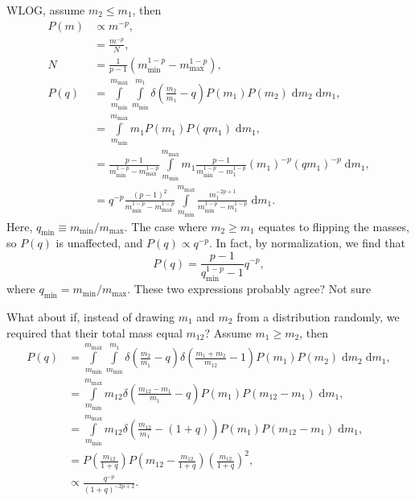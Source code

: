 \documentclass[11pt,
        usenames, %
        dvipsnames %
    ]{article}
\newcommand*{\p}[1]{\left(#1\right)}
\begin{document}
WLOG, assume $m_2 \leq m_1$, then
\begin{align}
    P(m) &\propto m^{-p},\\
         &= \frac{m^{-p}}{N},\\
    N &= \frac{1}{p - 1}\p{m_{\min}^{1 - p} - m_{\max}^{1 - p}},\\
    P(q) &= \int\limits_{m_{\min}}^{m_{\max}}\int\limits_{m_{\min}}^{m_1}
            \delta\p{\frac{m_2}{m_1} - q}P(m_1) P(m_2)
            \;\mathrm{d}m_2\;\mathrm{d}m_1,\\
        &= \int\limits_{m_{\min}}^{m_{\max}} m_1 P(m_1) P(qm_1)
            \;\mathrm{d}m_1,\\
        &= \frac{p - 1}{m_{\min}^{1 - p} - m_{\max}^{1 - p}}
            \int\limits_{m_{\min}}^{m_{\max}}
            m_1
            \frac{p - 1}{m_{\min}^{1 - p} - m_1^{1 - p}}
            \p{m_1}^{-p}\p{qm_1}^{-p}\;\mathrm{d}m_1,\\
        &= q^{-p}\frac{(p - 1)^2}{m_{\min}^{1 - p} - m_{\max}^{1 - p}}
            \int\limits_{m_{\min}}^{m_{\max}}
            \frac{m_1^{-2p + 1}}{m_{\min}^{1 - p} - m_1^{1 - p}}
            \;\mathrm{d}m_1.
\end{align}
Here, $q_{\min} \equiv m_{\min} / m_{\max}$. The case where $m_2 \geq m_1$
equates to flipping the masses, so $P(q)$ is unaffected, and $P(q) \propto
q^{-p}$. In fact, by normalization, we find that
\begin{equation}
    P(q) = \frac{p - 1}{q_{\min}^{1 - p} - 1}q^{-p},
\end{equation}
where $q_{\min} = m_{\min} / m_{\max}$. These two expressions probably agree?
Not sure

What about if, instead of drawing $m_1$ and $m_2$ from a distribution randomly,
we required that their total mass equal $m_{12}$? Assume $m_1 \geq m_2$, then
\begin{align}
    P(q) &= \int\limits_{m_{\min}}^{m_{\max}}
            \int\limits_{m_{\min}}^{m_1}
            \delta\p{\frac{m_2}{m_1} - q}
            \delta\p{\frac{m_1 + m_2}{m_{12}} - 1}
            P(m_1)
            P\p{m_2}\;\mathrm{d}m_2\;\mathrm{d}m_1,\\
        &= \int\limits_{m_{\min}}^{m_{\max}}
            m_{12}\delta\p{\frac{m_{12} - m_1}{m_1} - q}
            P(m_1)
            P\p{m_{12} - m_1}\;\mathrm{d}m_1,\\
        &=\int\limits_{m_{\min}}^{m_{\max}}
            m_{12}
            \delta\p{\frac{m_{12}}{m_1} - (1 + q)}
            P\p{m_1}
            P\p{m_{12} - m_1}\;\mathrm{d}m_1,\\
        &= P\p{\frac{m_{12}}{1 + q}}P\p{m_{12} - \frac{m_{12}}{1 + q}}
            \p{\frac{m_{12}}{1 + q}}^2,\\
        &\propto \frac{q^{-p}}{\p{1 + q}^{-2p + 2}}.
\end{align}
\end{document}
